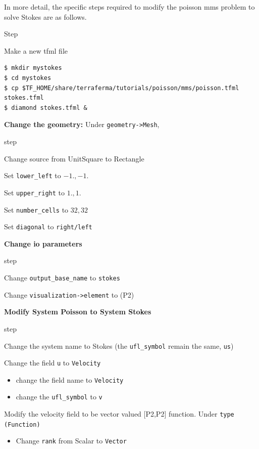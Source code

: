 \pagebreak{}

In more detail, the specific steps required to modify the poisson mms
problem to solve Stokes are as follows.
\begin{steps}{Step}
\item Make a new tfml file
  \begin{lstlisting}[style=Bash]
$ mkdir mystokes
$ cd mystokes
$ cp $TF_HOME/share/terraferma/tutorials/poisson/mms/poisson.tfml stokes.tfml
$ diamond stokes.tfml &
  \end{lstlisting}%
\item \textbf{Change the geometry:} Under \texttt{geometry->Mesh},
  \begin{steps}{step}
  \item Change source from UnitSquare to Rectangle
  \item Set \texttt{lower\_left} to $-1.,-1.$
  \item Set \texttt{upper\_right} to $1.,1.$
  \item Set \texttt{number\_cells} to $32,32$
  \item Set \texttt{diagonal} to \texttt{right/left}
  \end{steps}
\item \textbf{Change io parameters}
  \begin{steps}{step}
  \item Change \texttt{output\_base\_name} to \texttt{stokes}
  \item Change \texttt{visualization->element} to (P2)
  \end{steps}
\item \textbf{Modify System Poisson to System Stokes}
  \begin{steps}{step}
  \item Change the system name to  Stokes (the \texttt{ufl\_symbol}
    remain the same, \texttt{us})
  \item Change the field \texttt{u} to \texttt{Velocity}
    \begin{itemize}{}
    \item change the field name to \texttt{Velocity}
    \item change the \texttt{ufl\_symbol} to \texttt{v}
    \end{itemize}
  \item Modify the velocity field to be vector valued [P2,P2]
    function.   Under \texttt{type (Function)}
    \begin{itemize}{}
    \item Change \texttt{rank} from Scalar to \texttt{Vector}

\end{itemize}
\end{steps}
\end{steps}
